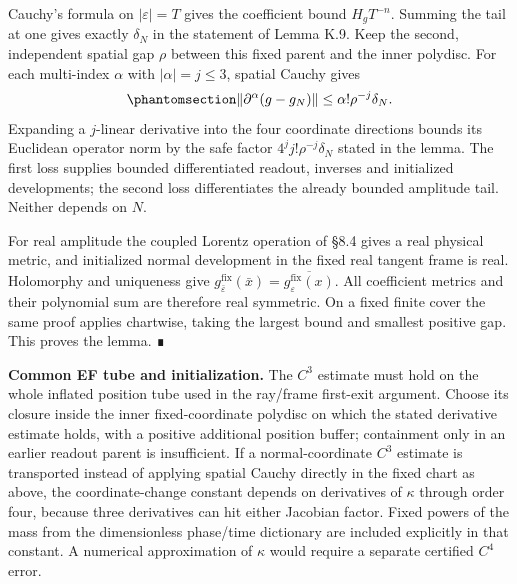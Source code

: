\documentclass[
  english,
  11pt,
  reqno]{amsart}
\begin{document}
Cauchy's formula on \(|\varepsilon|=T\) gives the coefficient bound
\(H_gT^{-n}\). Summing the tail at one gives exactly \(\delta_N\) in the
statement of Lemma K.9. Keep the second, independent spatial gap
\(\rho\) between this fixed parent and the inner polydisc. For each
multi-index \(\alpha\) with \(|\alpha|=j\le3\), spatial Cauchy gives
\begin{equation}\protect\phantomsection\label{eq:sh-r1-second-gap-cauchy}{
 \|\partial^\alpha(g-g_N)\|
 \le\alpha!\rho^{-j}\delta_N.
}\end{equation} Expanding a \(j\)-linear derivative into the four
coordinate directions bounds its Euclidean operator norm by the safe
factor \(4^j j!\rho^{-j}\delta_N\) stated in the lemma. The first loss
supplies bounded differentiated readout, inverses and initialized
developments; the second loss differentiates the already bounded
amplitude tail. Neither depends on \(N\).

For real amplitude the coupled Lorentz operation of §8.4 gives a real
physical metric, and initialized normal development in the fixed real
tangent frame is real. Holomorphy and uniqueness give
\(g^{\mathrm{fix}}_{\bar\varepsilon}(\bar x)=\overline{g^{\mathrm{fix}}_\varepsilon(x)}\).
All coefficient metrics and their polynomial sum are therefore real
symmetric. On a fixed finite cover the same proof applies chartwise,
taking the largest bound and smallest positive gap. This proves the
lemma. ∎

\protect{}\label{sec:sh-r1-ef-tube-and-initialization}

\textbf{Common EF tube and initialization.} The \(C^3\) estimate must
hold on the whole inflated position tube used in the ray/frame
first-exit argument. Choose its closure inside the inner
fixed-coordinate polydisc on which the stated derivative estimate holds,
with a positive additional position buffer; containment only in an
earlier readout parent is insufficient. If a normal-coordinate \(C^3\)
estimate is transported instead of applying spatial Cauchy directly in
the fixed chart as above, the coordinate-change constant depends on
derivatives of \(\kappa\) through order four, because three derivatives
can hit either Jacobian factor. Fixed powers of the mass from the
dimensionless phase/time dictionary are included explicitly in that
constant. A numerical approximation of \(\kappa\) would require a
separate certified \(C^4\) error.
\end{document}
